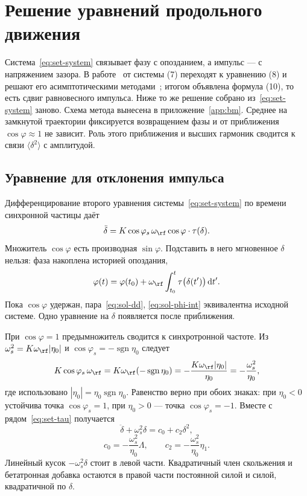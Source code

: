 \section{Решение уравнений продольного движения}
\label{sec:sol}

Система~\eqref{eq:set-system} связывает фазу с опозданием, а импульс --- с напряжением зазора. В работе~\cite{Senichev2013} от системы (7) переходят к уравнению (8) и решают его асимптотическими методами~\cite{Bogoliubov1961}; итогом объявлена формула (10), то есть сдвиг равновесного импульса. Ниже то же решение собрано из~\eqref{eq:set-system} заново. Схема метода вынесена в приложение~\ref{app:bm}. Среднее на замкнутой траектории фиксируется возвращением фазы и от приближения $\cos\varphi\approx 1$ не зависит. Роль этого приближения и высших гармоник сводится к связи $\langle\delta^2\rangle$ с амплитудой.

\subsection{Уравнение для отклонения импульса}
\label{sec:sol-ode}

Дифференцирование второго уравнения системы~\eqref{eq:set-system} по времени синхронной частицы даёт
\begin{equation}
\label{eq:sol-dd}
\ddot\delta
=K\cos\varphi_s\,\omega_\rf\cos\varphi\cdot\tau(\delta).
\end{equation}
Множитель $\cos\varphi$ есть производная $\sin\varphi$. Подставить в него мгновенное $\delta$ нельзя: фаза накоплена историей опоздания,
\begin{equation}
\label{eq:sol-phi-int}
\varphi(t)
=\varphi(t_0)
+\omega_\rf\int_{t_0}^{t}\tau\bigl(\delta(t')\bigr)\,\mathrm{d}t'.
\end{equation}
Пока $\cos\varphi$ удержан, пара~\eqref{eq:sol-dd}, \eqref{eq:sol-phi-int} эквивалентна исходной системе. Одно уравнение на $\delta$ появляется после приближения.

При $\cos\varphi=1$ предымножитель сводится к синхротронной частоте. Из $\omega_s^2=K\omega_\rf|\eta_0|$ и $\cos\varphi_s=-\operatorname{sgn}\eta_0$ следует
\begin{equation}
\label{eq:sol-pref}
K\cos\varphi_s\,\omega_\rf
=K\omega_\rf(-\operatorname{sgn}\eta_0)
=-\frac{K\omega_\rf|\eta_0|}{\eta_0}
=-\frac{\omega_s^2}{\eta_0},
\end{equation}
где использовано $|\eta_0|=\eta_0\operatorname{sgn}\eta_0$. Равенство верно при обоих знаках: при $\eta_0<0$ устойчива точка $\cos\varphi_s=1$, при $\eta_0>0$ --- точка $\cos\varphi_s=-1$. Вместе с рядом~\eqref{eq:set-tau} получается
\begin{equation}
\label{eq:sol-reduced}
\ddot\delta+\omega_s^2\delta=c_0+c_2\delta^2,
\end{equation}
\begin{equation}
\label{eq:sol-c}
c_0=-\frac{\omega_s^2}{\eta_0}\Lambda,
\qquad
c_2=-\frac{\omega_s^2}{\eta_0}\eta_1.
\end{equation}
Линейный кусок $-\omega_s^2\delta$ стоит в левой части. Квадратичный член скольжения и бетатронная добавка остаются в правой части постоянной силой и силой, квадратичной по $\delta$.

